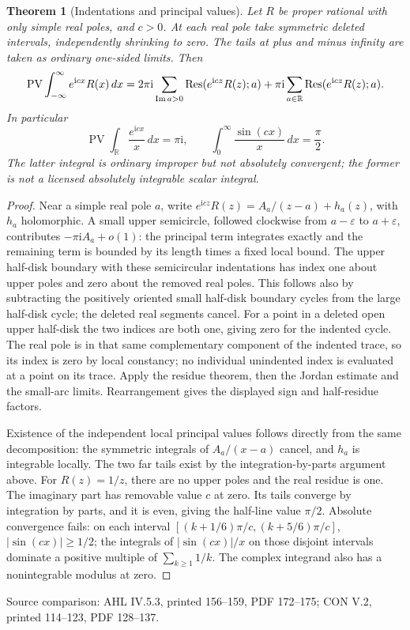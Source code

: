 \documentclass[11pt,a4paper,openany]{book}
\newtheorem{theorem}{Theorem}[chapter]
\theoremstyle{definition}
\theoremstyle{remark}\newtheorem{remark}[theorem]{Remark}
\newcommand{\R}{\mathbb R}\newcommand{\C}{\mathbb C}
\newcommand{\eps}{\varepsilon}\newcommand{\ee}{\varepsilon}
\newcommand{\dd}{\,d}\newcommand{\iu}{\mathrm i}
\DeclareMathOperator{\Res}{Res}\DeclareMathOperator{\ind}{ind}
\newcommand{\family}[1]{}
\newcommand{\source}[1]{\par\begingroup\small\sffamily\color{black!65}Source comparison: #1\par\endgroup}
\begin{document}
\begin{theorem}[Indentations and principal values]\family{D12.08.06}\label{d12:08-06}
Let \(R\) be proper rational with only simple real poles, and \(c>0\).
At each real pole take symmetric deleted intervals, independently
shrinking to zero. The tails at plus and minus infinity are taken as
ordinary one-sided limits. Then
\[
 \operatorname{PV}\int_{-\infty}^{\infty}e^{\iu cx}R(x)\dd x
 =2\pi\iu\sum_{\Imm a>0}\Res(e^{\iu cz}R(z);a)
   +\pi\iu\sum_{a\in\R}\Res(e^{\iu cz}R(z);a).
\]
In particular
\[
 \operatorname{PV}\int_{\R}\frac{e^{\iu cx}}x\dd x=\pi\iu,\qquad
 \int_0^\infty\frac{\sin(cx)}x\dd x=\frac\pi2 .
\]
The latter integral is ordinary improper but not absolutely convergent;
the former is not a licensed absolutely integrable scalar integral.
\end{theorem}
\begin{proof}
Near a simple real pole \(a\), write
\(e^{\iu cz}R(z)=A_a/(z-a)+h_a(z)\), with \(h_a\) holomorphic.
A small upper semicircle, followed clockwise from \(a-\eps\) to
\(a+\eps\), contributes \(-\pi\iu A_a+o(1)\):
the principal term integrates exactly and the remaining term is bounded
by its length times a fixed local bound.
The upper half-disk boundary with these semicircular indentations
has index one about upper poles and zero about the removed real poles.
This follows also by subtracting the positively oriented small
half-disk boundary cycles from the large half-disk cycle; the deleted
real segments cancel. For a point in a deleted open upper half-disk
the two indices are both one, giving zero for the indented cycle.
The real pole is in that same complementary component of the indented
trace, so its index is zero by local constancy; no individual unindented
index is evaluated at a point on its trace. Apply the residue theorem, then the Jordan
estimate and the small-arc limits. Rearrangement gives the displayed
sign and half-residue factors.

Existence of the independent local principal values follows directly
from the same decomposition: the symmetric integrals of
\(A_a/(x-a)\) cancel, and \(h_a\) is integrable locally.
The two far tails exist by the integration-by-parts argument above.
For \(R(z)=1/z\), there are no upper poles and the real residue is one.
The imaginary part has removable value \(c\) at zero.
Its tails converge by integration by parts, and it is even, giving
the half-line value \(\pi/2\).
Absolute convergence fails: on each interval
\([(k+1/6)\pi/c,(k+5/6)\pi/c]\), \(|\sin(cx)|\ge1/2\);
the integrals of \(|\sin(cx)|/x\) on those disjoint intervals dominate
a positive multiple of \(\sum_{k\ge1}1/k\).
The complex integrand also has a nonintegrable modulus at zero.
\end{proof}
\source{AHL IV.5.3, printed 156--159, PDF 172--175; CON V.2, printed 114--123, PDF 128--137.}
\end{document}
